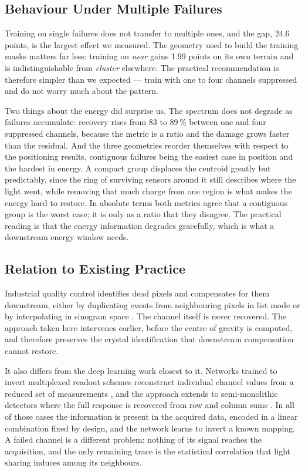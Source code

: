 \documentclass[10pt,conference]{IEEEtran}
\begin{document}
\subsection{Behaviour Under Multiple Failures}

Training on single failures does not transfer to multiple ones, and the gap,
24.6 points, is the largest effect we measured. The geometry used to build the
training masks matters far less: training on \emph{near} gains 1.99 points on
its own terrain and is indistinguishable from \emph{cluster} elsewhere. The
practical recommendation is therefore simpler than we expected --- train with
one to four channels suppressed and do not worry much about the pattern.

Two things about the energy did surprise us. The spectrum does not degrade as
failures accumulate: recovery rises from 83 to 89\,\% between one and four
suppressed channels, because the metric is a ratio and the damage grows faster
than the residual. And the three geometries reorder themselves with respect to
the positioning results, contiguous failures being the easiest case in position
and the hardest in energy. A compact group displaces the centroid greatly but
predictably, since the ring of surviving sensors around it still describes
where the light went, while removing that much charge from one region is what
makes the energy hard to restore. In absolute terms both metrics agree that a
contiguous group is the worst case; it is only as a ratio that they disagree.
The practical reading is that the energy information degrades gracefully, which
is what a downstream energy window needs.

\subsection{Relation to Existing Practice}

Industrial quality control identifies dead pixels and compensates for them
downstream, either by duplicating events from neighbouring pixels in list mode
or by interpolating in sinogram space \cite{philips2015deadpixel}. The channel
itself is never recovered. The approach taken here intervenes earlier, before
the centre of gravity is computed, and therefore preserves the crystal
identification that downstream compensation cannot restore.

It also differs from the deep learning work closest to it. Networks trained to
invert multiplexed readout schemes reconstruct individual channel values from a
reduced set of measurements \cite{li2023, niu_cnn-based_2024}, and the approach
extends to semi-monolithic detectors where the full response is recovered from
row and column sums \cite{loignon-houle_multi-input_2026}. In all of those
cases the information is present in the acquired data, encoded in a linear
combination fixed by design, and the network learns to invert a known mapping.
A failed channel is a different problem: nothing of its signal reaches the
acquisition, and the only remaining trace is the statistical correlation that
light sharing induces among its neighbours.
\end{document}
